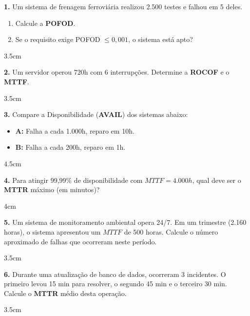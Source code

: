 \documentclass[12pt,a4paper]{report}
\begin{document}
\vspace{0.4cm}

\textbf{1.} Um sistema de frenagem ferroviária realizou 2.500 testes e falhou em 5 deles. 
\begin{enumerate}[label=\alph*)]
    \item Calcule a \textbf{POFOD}.
    \item Se o requisito exige POFOD $\le 0,001$, o sistema está apto?
\end{enumerate}
\begin{resposta}{3.5cm}
\end{resposta}

\vspace{0.4cm}

\textbf{2.} Um servidor operou 720h com 6 interrupções. Determine a \textbf{ROCOF} e o \textbf{MTTF}.
\begin{resposta}{3.5cm}
\end{resposta}

\vspace{0.4cm}

\textbf{3.} Compare a Disponibilidade (\textbf{AVAIL}) dos sistemas abaixo:
\begin{itemize}
    \item \textbf{A:} Falha a cada 1.000h, reparo em 10h.
    \item \textbf{B:} Falha a cada 200h, reparo em 1h.
\end{itemize}
\begin{resposta}{4.5cm}
\end{resposta}

\vspace{0.4cm}

\textbf{4.} Para atingir 99,99\% de disponibilidade com $MTTF = 4.000h$, qual deve ser o \textbf{MTTR} máximo (em minutos)?
\begin{resposta}{4cm}
\end{resposta}


\textbf{5.} Um sistema de monitoramento ambiental opera 24/7. Em um trimestre (2.160 horas), o sistema apresentou um $MTTF$ de 500 horas. Calcule o número aproximado de falhas que ocorreram neste período.
\begin{resposta}{3.5cm}
\end{resposta}

\vspace{0.5cm}

\textbf{6.} Durante uma atualização de banco de dados, ocorreram 3 incidentes. O primeiro levou 15 min para resolver, o segundo 45 min e o terceiro 30 min. Calcule o \textbf{MTTR} médio desta operação.
\begin{resposta}{3.5cm}
\end{resposta}
\end{document}
